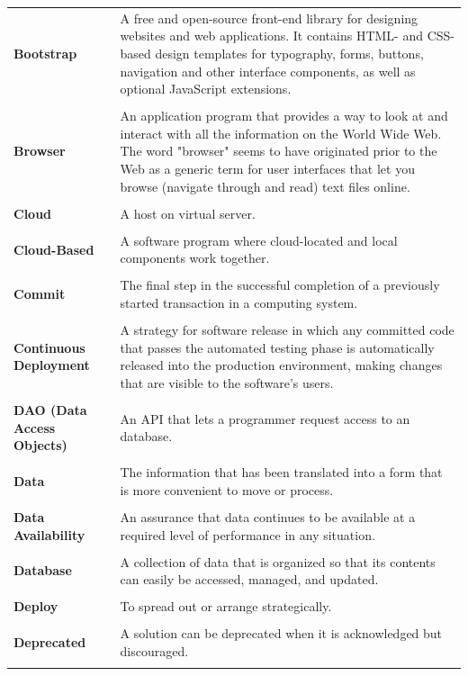 \documentclass[a4paper,11pt,twoside]{report}
\theoremstyle{definition}
\begin{document}
\begin{longtable}{p{4cm} p{11cm}}
\textbf{Bootstrap} & A free and open-source front-end library for designing websites and web applications. It contains HTML- and CSS-based design templates for typography, forms, buttons, navigation and other interface components, as well as optional JavaScript extensions. \\ \\
\textbf{Browser} & An application program that provides a way to look at and interact with all the information on the World Wide Web. The word "browser" seems to have originated prior to the Web as a generic term for user interfaces that let you browse (navigate through and read) text files online.\\ \\
\textbf{Cloud} & A host on virtual server.\\ \\
\textbf{Cloud-Based} & A software program where cloud-located and local components work together.\\ \\
\textbf{Commit} & The final step in the successful completion of a previously started transaction in a computing system.\\ \\
\textbf{Continuous \mbox{Deployment}} & A strategy for software release in which any committed code that passes the automated testing phase is automatically released into the production environment, making changes that are visible to the software's users.\\ \\
\textbf{DAO (Data Access Objects)} & An API that lets a programmer request access to an database.\\ \\
\textbf{Data} & The information that has been translated into a form that is more convenient to move or process.\\ \\
\textbf{Data Availability} & An assurance that data continues to be available at a required level of performance in any situation.\\ \\
\textbf{Database} & A collection of data that is organized so that its contents can easily be accessed, managed, and updated.\\ \\
\textbf{Deploy} & To spread out or arrange strategically.\\ \\
\textbf{Deprecated} & A solution can be deprecated when it is acknowledged but discouraged.\\ \\

\end{longtable}
\end{document}
